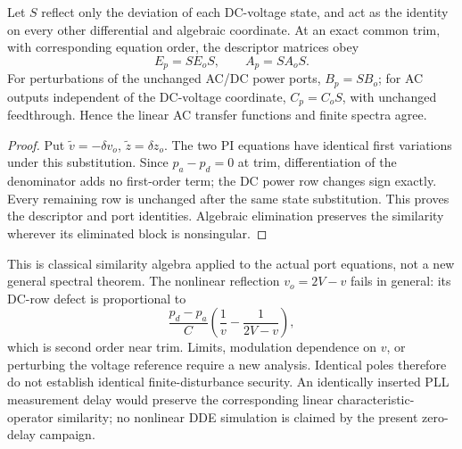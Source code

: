 \begin{proposition}
Let $S$ reflect only the deviation of each DC-voltage state, and act as the
identity on every other differential and algebraic coordinate. At an exact
common trim, with corresponding equation order, the descriptor matrices obey
\begin{equation}
 E_p=SE_oS,\qquad A_p=SA_oS.\label{eq:dc-similarity-bridge}
\end{equation}
For perturbations of the unchanged AC/DC power ports, $B_p=SB_o$; for AC
outputs independent of the DC-voltage coordinate, $C_p=C_oS$, with unchanged
feedthrough. Hence the linear AC transfer functions and finite spectra agree.
\end{proposition}
\begin{proof}
Put $\widetilde v=-\delta v_o$, $\widetilde z=\delta z_o$. The two PI
equations have identical first variations under this substitution. Since
$p_a-p_d=0$ at trim, differentiation of the denominator adds no first-order
term; the DC power row changes sign exactly. Every remaining row is unchanged
after the same state substitution. This proves the descriptor and port
identities. Algebraic elimination preserves the similarity wherever its
eliminated block is nonsingular.
\end{proof}
This is classical similarity algebra applied to the actual port equations,
not a new general spectral theorem. The nonlinear reflection
$v_o=2V-v$ fails in general: its DC-row defect is proportional to
\begin{equation}
 \frac{p_d-p_a}{C}\left(\frac1v-\frac1{2V-v}\right),
\end{equation}
which is second order near trim. Limits, modulation dependence on $v$, or
perturbing the voltage reference require a new analysis. Identical poles
therefore do not establish identical finite-disturbance security. An
identically inserted PLL measurement delay would preserve the corresponding
linear characteristic-operator similarity; no nonlinear DDE simulation is
claimed by the present zero-delay campaign.

